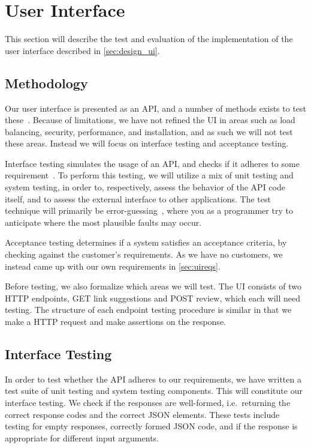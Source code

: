 \section{User Interface}
This section will describe the test and evaluation of the implementation of the user interface described in \cref{sec:design_ui}.

\subsection{Methodology}
Our user interface is presented as an API, and a number of methods exists to test these~\cite{swebok}. Because of limitations, we have not refined the UI in areas such as load balancing, security, performance, and installation, and as such we will not test these areas. Instead we will focus on interface testing and acceptance testing.

Interface testing simulates the usage of an API, and checks if it adheres to some requirement~\cite{swebok}. To perform this testing, we will utilize a mix of unit testing and system testing, in order to, respectively, assess the behavior of the API code itself, and to assess the external interface to other applications. The test technique will primarily be error-guessing~\cite{swebok}, where you as a programmer try to anticipate where the most plausible faults may occur.

Acceptance testing determines if a system satisfies an acceptance criteria, by checking against the customer's requirements. As we have no customers, we instead came up with our own requirements in \cref{sec:uireqs}.


Before testing, we also formalize which areas we will test. The UI consists of two HTTP endpoints, GET link suggestions and POST review, which each will need testing. The structure of each endpoint testing procedure is similar in that we make a HTTP request and make assertions on the response.

\subsection{Interface Testing}
In order to test whether the API adheres to our requirements, we have written a test suite of unit testing and system testing components. This will constitute our interface testing. We check if the responses are well-formed, i.e.\ returning the correct response codes and the correct JSON elements. These tests include testing for empty responses, correctly formed JSON code, and if the response is appropriate for different input arguments.

